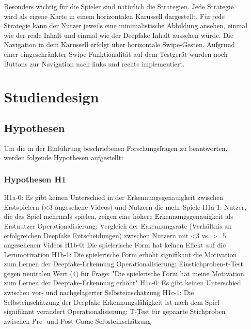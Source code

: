 Besonders wichtig für die Spieler sind natürlich die Strategien. 
Jede Strategie wird als eigene Karte in einem horizontalen Karussell dargestellt. 
Für jede Strategie kann der Nutzer jeweils eine minimalistische Abbildung ansehen, einmal wie der reale Inhalt und einmal wie der Deepfake Inhalt aussehen würde. 
Die Navigation in dem Karussell erfolgt über horizontale Swipe-Gesten. 
Aufgrund einer eingeschränkter Swipe-Funktionalität auf dem Testgerät wurden noch Buttons zur Navigation nach links und rechts implementiert.
\chapter{Studiendesign}
\label{sec:studiendesign}
\section{Hypothesen}
Um die in der Einführung beschriebenen Forschungsfragen zu beantworten, werden folgende Hypothesen aufgestellt:
\subsection{Hypothesen H1}
H1a-0: Es gibt keinen Unterschied in der Erkennungsgenauigkeit zwischen Erstspielern (<3 angesehene Videos) und Nutzern die mehr Spiele 
H1a-1: Nutzer, die das Spiel mehrmals spielen, zeigen eine höhere Erkennungsgenauigkeit als Erstnutzer
Operationalisierung: Vergleich der Erkennungsrate (Verhältnis an erfolgreichen Deepfake Entscheidungen) zwischen Nutzern mit <3 vs. >=5 angesehenen Videos
H1b-0: Die spielerische Form hat keinen Effekt auf die Lernmotivation
H1b-1: Die spielerische Form erhöht signifikant die Motivation zum Lernen der Deepfake-Erkennung
Operationalisierung: Einstichproben-t-Test gegen neutralen Wert (4) für Frage: "Die spielerische Form hat meine Motivation zum Lernen der Deepfake-Erkennung erhöht"
H1c-0: Es gibt keinen Unterschied zwischen vor- und nachgelagerter Selbsteinschätzung
H1c-1: Die Selbsteinschätzung der Deepfake Erkennungsfähigkeit ist nach dem Spiel signifikant verändert
Operationalisierung: T-Test für gepaarte Stichproben zwischen Pre- und Post-Game Selbsteinschätzung
